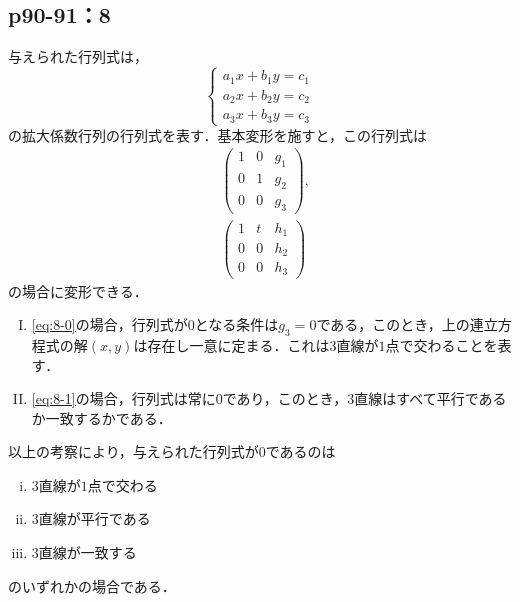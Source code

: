 \documentclass[uplatex,dvipdfmx,a4paper,11pt,fleqn]{jsarticle}
\begin{document}
    \newpage 


\subsection*{p90-91：8}

\begin{tleftbar} 
    与えられた行列式は，
    \[
        \begin{cases}
            a_1 x + b_1 y =c_1 \\
            a_2 x + b_2 y =c_2 \\
            a_3 x + b_3 y =c_3 
        \end{cases}
    \]
    の拡大係数行列の行列式を表す．基本変形を施すと，この行列式は
    \begin{align} 
        & \begin{pmatrix}
            1 & 0 & g_1 \\
            0 & 1 & g_2 \\
            0 & 0 & g_3 
        \end{pmatrix}
        \label{eq:8-0}
        , \\
        &\begin{pmatrix} 
            1 & t & h_1 \\
            0 & 0 & h_2 \\
            0 & 0 & h_3 
        \end{pmatrix}
        \label{eq:8-1}
    \end{align}
    の場合に変形できる．

    \begin{enumerate}[(I)]
        \item \eqref{eq:8-0}の場合，行列式が$0$となる条件は$g_3 =0$である，このとき，上の連立方程式の解$(x,y)$は存在し一意に定まる．これは$3$直線が$1$点で交わることを表す．
        \item \eqref{eq:8-1}の場合，行列式は常に$0$であり，このとき，3直線はすべて平行であるか一致するかである．
    \end{enumerate}

    以上の考察により，与えられた行列式が$0$であるのは
    \begin{enumerate}[(i)]
    \item 3直線が$1$点で交わる
    \item 3直線が平行である
    \item 3直線が一致する
    \end{enumerate}
    のいずれかの場合である．
\end{tleftbar}
\end{document}

